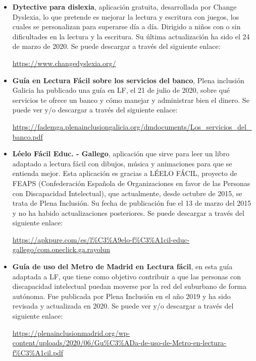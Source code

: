 \begin{itemize}
\item {\textbf{Dytective para dislexia}}, aplicación gratuita, desarrollada por Change Dyslexia, lo que pretende es mejorar la lectura y escritura con juegos, los cuales se personalizan para superarse día a día. Dirigido a niños con o sin dificultades en la lectura y la escritura. Su última actualización ha sido el 24 de marzo de 2020. Se puede descargar a través del siguiente enlace:

\href{https://www.changedyslexia.org/}{https://www.changedyslexia.org/}

\item {\textbf{Guía en Lectura Fácil sobre los servicios del banco}}, Plena inclusión Galicia ha publicado una guía en LF, el 21 de julio de 2020, sobre qué servicios te ofrece un banco y cómo manejar y administrar bien el dinero. Se puede ver y/o descargar a través del siguiente enlace:

\href{https://fademga.plenainclusiongalicia.org/dmdocuments/Los\_servicios\_del\_banco.pdf}{https://fademga.plenainclusiongalicia.org/dmdocuments/Los\_servicios\_del\_banco.pdf}


\item {\textbf{Léelo Fácil Educ. - Gallego}}, aplicación que sirve para leer un libro adaptado a lectura fácil con dibujos, música y animaciones para que se entienda mejor. Esta aplicación es gracias a LÉELO FÁCIL, proyecto de FEAPS (Confederación Española de Organizaciones en
favor de las Personas con Discapacidad Intelectual), que actualmente, desde octubre de 2015, se trata de Plena Inclusión. Su fecha de publicación fue el 13 de marzo del 2015 y no ha habido actualizaciones posteriores. Se puede descargar a través del siguiente enlace:

\href{https://apkpure.com/es/l\%C3\%A9elo-f\%C3\%A1cil-educ-gallego/com.oneclick.ga.rayoluna}{https://apkpure.com/es/l\%C3\%A9elo-f\%C3\%A1cil-educ-gallego/com.oneclick.ga.rayolun}

\item
{\textbf{Guía de uso del Metro de Madrid en Lectura fácil}}, en esta guía adaptada a LF, que tiene como objetivo contribuir a que las personas con discapacidad intelectual puedan moverse por la red del suburbano de forma autónoma. Fue publicada por Plena Inclusión en el año 2019 y ha sido revisada y actualizada en 2020. Se puede ver y/o descargar a través del siguiente enlace:


\href{https://plenainclusionmadrid.org/wp-content/uploads/2020/06/Gu\%C3\%ADa-de-uso-de-Metro-en-lectura-f\%C3\%A1cil.pdf}{https://plenainclusionmadrid.org/wp-content/uploads/2020/06/Gu\%C3\%ADa-de-uso-de-Metro-en-lectura-f\%C3\%A1cil.pdf}


\end{itemize}
